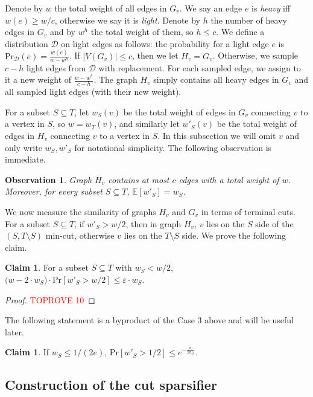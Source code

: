 \documentclass[11pt]{article}
\newtheorem{observation}[theorem]{Observation}
\theoremstyle{definition}
\newtheorem{claim}[theorem]{Claim}
\newcommand{\dset}{{\mathcal{D}}}
\newcommand{\eps}{{\varepsilon}}
\def\pr#1{\mathrm{Pr}\left[ #1 \right]}
\def\ex#1{{\mathbb{E}}\left[ #1 \right]}
\newcounter{note}
\begin{document}
Denote by $w$ the total weight of all edges in $G_v$.
We say an edge $e$ is \emph{heavy} iff $w(e)\ge w/c$, otherwise we say it is \emph{light}.
Denote by $h$ the number of heavy edges in $G_v$ and by $w^h$ the total weight of them, so $h\le c$.
We define a distribution $\dset$ on light edges as follows: the probability for a light edge $e$ is 
$\text{Pr}_{\dset}(e)=\frac{w(e)}{w-w^h}.$
If $|V(G_v)|\le c$, then we let $H_v=G_v$.
Otherwise, we sample $c-h$ light edges from $\dset$ with replacement. For each sampled edge, we assign to it a new weight of $\frac{w-w^h}{c-h}$.
The graph $H_v$ simply contains all heavy edges in $G_v$ and all sampled light edges (with their new weight).

For a subset $S\subseteq T$, let $w_S(v)$ be the total weight of edges in $G_v$ connecting $v$ to a vertex in $S$, so $w=w_T(v)$, and similarly let $w'_S(v)$ be the total weight of edges in $H_v$ connecting $v$ to a vertex in $S$. 
In this subsection we will omit $v$ and only write $w_S,w'_S$ for notational simplicity.
The following observation is immediate.

\begin{observation}
\label{obs: property}
Graph $H_v$ contains at most $c$ edges with a total weight of $w$. Moreover, for every subset $S\subseteq T$, $\ex{w'_S}=w_S$.
\end{observation}

We now measure the similarity of graphs $H_v$ and $G_v$ in terms of terminal cuts.
For a subset $S\subseteq T$, if $w'_S>w/2$, then in graph $H_v$, $v$ lies on the $S$ side of the $(S, T\setminus S)$ min-cut, otherwise $v$ lies on the $T\setminus S$ side. 
We prove the following claim.

\begin{claim}
\label{clm: difference in contribution}
For a subset $S\subseteq T$ with $w_S<w/2$, $\big(w-2\cdot w_S\big) \cdot \pr{w'_S>w/2} \le \eps \cdot w_S$.
\end{claim}
\begin{proof}\textcolor{red}{TOPROVE 10}\end{proof}

The following statement is a byproduct of the Case 3 above and will be useful later.
\begin{claim} \label{prop:v2}
	If $w_S \le 1/(2e)$, $\pr{w'_S > 1/2} \le e^{-\frac{w}{2w_S}}$.
\end{claim}

\subsection{Construction of the cut sparsifier}
\end{document}
